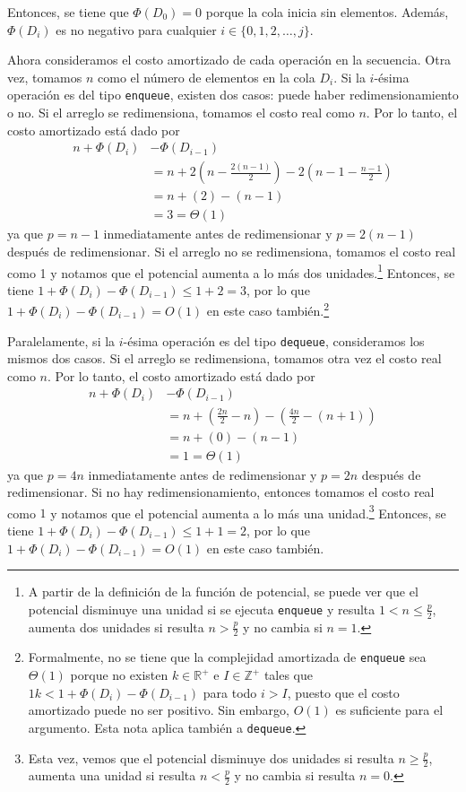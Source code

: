 Entonces, se tiene que $\Phi{}(D_0) = 0$ porque la cola inicia sin elementos. Además, $\Phi{}(D_i)$ es no negativo para cualquier $i \in \{ 0, 1, 2, \dots, j\}$.

Ahora consideramos el costo amortizado de cada operación en la secuencia. Otra vez, tomamos $n$ como el número de elementos en la cola $D_{i}$. Si la $i$-ésima operación es del tipo \texttt{enqueue}, existen dos casos: puede haber redimensionamiento o no. Si el arreglo se redimensiona, tomamos el costo real como $n$. Por lo tanto, el costo amortizado está dado por
\begin{align*}
	n + \Phi{}(D_{i}) &- \Phi{}(D_{i - 1}) \\
	&= n + 2\left(n - \frac{2(n - 1)}{2}\right) - 2\left(n - 1 - \frac{n - 1}{2}\right) \\
	&= n + \left(2\right) - \left(n - 1\right) \\
	&= 3 = \Theta{}(1)
\end{align*}
ya que $p = n - 1$ inmediatamente antes de redimensionar y $p = 2(n - 1)$ después de redimensionar. Si el arreglo no se redimensiona, tomamos el costo real como 1 y notamos que el potencial aumenta a lo más dos unidades.\footnote{A partir de la definición de la función de potencial, se puede ver que el potencial disminuye una unidad si se ejecuta \texttt{enqueue} y resulta $1 < n \le \frac{p}{2}$, aumenta dos unidades si resulta $n > \frac{p}{2}$ y no cambia si $n = 1$.} Entonces, se tiene $1 + \Phi{}(D_{i}) - \Phi{}(D_{i - 1}) \le 1 + 2 = 3$, por lo que $1 + \Phi{}(D_{i}) - \Phi{}(D_{i - 1}) = O(1)$ en este caso también.\footnote{Formalmente, no se tiene que la complejidad amortizada de \texttt{enqueue} sea $\Theta{}(1)$ porque no existen $k \in \mathbb{R}^{+}$ e $I \in \mathbb{Z}^{+}$ tales que $1k < 1 + \Phi{}(D_{i}) - \Phi{}(D_{i - 1})$ para todo $i > I$, puesto que el costo amortizado puede no ser positivo. Sin embargo, $O(1)$ es suficiente para el argumento. Esta nota aplica también a \texttt{dequeue}.}

Paralelamente, si la $i$-ésima operación es del tipo \texttt{dequeue}, consideramos los mismos dos casos. Si el arreglo se redimensiona, tomamos otra vez el costo real como $n$. Por lo tanto, el costo amortizado está dado por
\begin{align*}
	n + \Phi{}(D_{i}) &- \Phi{}(D_{i - 1}) \\
	&= n + \left(\frac{2n}{2} - n\right) - \left(\frac{4n}{2} - (n + 1)\right) \\
	&= n + \left(0\right) - \left(n - 1\right) \\
	&= 1 = \Theta{}(1)
\end{align*}
ya que $p = 4n$ inmediatamente antes de redimensionar y $p = 2n$ después de redimensionar. Si no hay redimensionamiento, entonces tomamos el costo real como $1$ y notamos que el potencial aumenta a lo más una unidad.\footnote{Esta vez, vemos que el potencial disminuye dos unidades si resulta $n \ge \frac{p}{2}$, aumenta una unidad si resulta $n < \frac{p}{2}$ y no cambia si resulta $n = 0$.} Entonces, se tiene $1 + \Phi{}(D_{i}) - \Phi{}(D_{i - 1}) \le 1 + 1 = 2$, por lo que $1 + \Phi{}(D_{i}) - \Phi{}(D_{i - 1}) = O(1)$ en este caso también.


